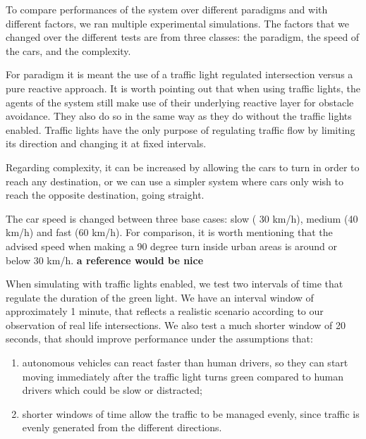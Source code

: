 

To compare performances of the system over different paradigms and with different factors, we ran
multiple experimental simulations.
The factors that we changed over the different tests are from three classes: the paradigm, the speed of the cars, and the complexity.

For paradigm it is meant the use of  a traffic light regulated intersection versus a pure reactive approach.
It is worth pointing out that when using traffic lights, the agents of the system still make use of their underlying reactive layer for obstacle avoidance.
They also do so in the same way as they do without the traffic lights enabled.
Traffic lights have the only purpose of regulating traffic flow by limiting its direction and changing it at fixed intervals.

Regarding complexity, it can be increased by allowing the cars to turn in order to reach any destination, or we can use a simpler system where cars only wish to reach the opposite destination, going straight.

The car speed is changed between three base cases: slow ( 30 km/h), medium (40 km/h) and fast (60 km/h).
For comparison, it is worth mentioning that the advised speed when making a 90 degree turn inside urban areas is around or below 30 km/h. \textbf{a reference would be nice} %

When simulating with traffic lights enabled, we test two intervals of time that regulate the duration of the green light.
We have an interval window of approximately 1 minute, that reflects a realistic scenario according to our observation of real life intersections.
We also test a much shorter window of 20 seconds, that should improve performance under the assumptions that:
\begin{enumerate}
\item autonomous vehicles can react faster than human drivers, so they can start moving immediately after the traffic light turns green compared to human drivers which could be slow or distracted;
\item shorter windows of time allow the traffic to be managed evenly, since traffic is evenly generated from the different directions.
\end{enumerate}

